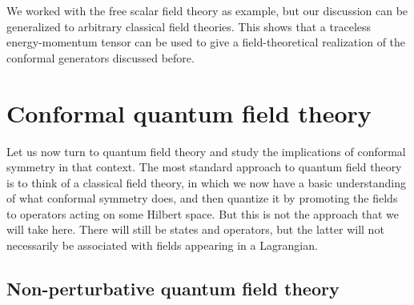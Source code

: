 \documentclass[a4paper,12pt]{article}
\numberwithin{equation}{section}
\newcounter{exercise}[section]
\begin{document}
We worked with the free scalar field theory as example, but our discussion can be generalized to arbitrary classical field theories. This shows that a traceless energy-momentum tensor can be used to give a field-theoretical realization of the conformal generators discussed before.



\section{Conformal quantum field theory}
\label{sec:quantum}

Let us now turn to quantum field theory and study the implications of conformal symmetry in that context. The most standard approach to quantum field theory is to think of a classical field theory, in which we now have a basic understanding of what conformal symmetry does, and then quantize it by promoting the fields to operators acting on some Hilbert space.
But this is not the approach that we will take here. There will still be states and operators, but the latter will not necessarily be associated with fields appearing in a Lagrangian.

\subsection{Non-perturbative quantum field theory}
\end{document}
